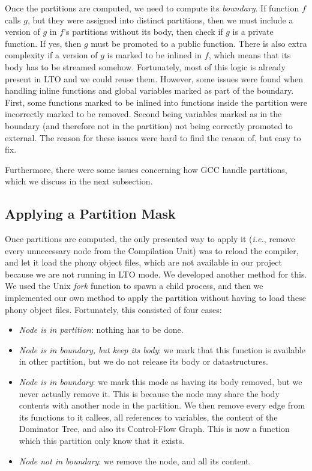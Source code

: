 \documentclass[runningheads]{llncs}
\begin{document}
Once the partitions are computed, we need to compute its \textit{boundary}.
If function $f$ calls $g$, but they were assigned into distinct partitions,
then we must include a version of $g$ in $f$'s partitions without its body,
then check if $g$ is a private function. If yes, then $g$ must be promoted
to a public function. There is also extra complexity if a version of $g$
is marked to be inlined in $f$, which means that its body has to be
streamed somehow. Fortunately, most of this logic is already present
in LTO and we could reuse them. However, some issues were found
when handling inline functions and global variables marked as part
of the boundary. First, some functions marked to be inlined into 
functions inside the partition were incorrectly marked to be removed.
Second being variables marked as in the boundary (and therefore
not in the partition) not being correctly promoted to external. The reason
for these issues were hard to find the reason of, but easy to fix.

Furthermore, there were some issues concerning how GCC handle
partitions, which we discuss in the next subsection.

\subsection{Applying a Partition Mask}\label{sec:partition_mask}

Once partitions are computed, the only presented way to apply it (\textit{i.e.},
remove every unnecessary node from the Compilation Unit) was to reload the
compiler, and let it load the phony object files, which are not available in our
project because we are not running in LTO mode. We developed another method for this.
We used the Unix \textit{fork} function to spawn a child process, and then
we implemented our own method to apply the partition without having to load
these phony object files. Fortunately, this consisted
of four cases:
\begin{itemize}
	\item \textit{Node is in partition}: nothing has to be done.
	\item \textit{Node is in boundary, but keep its body}: we mark that this function
	is available in other partition, but we do not release its body or
	datastructures.
	\item \textit{Node is in boundary}: we mark this mode as having its body removed,
	but we never actually remove it. This is because the node may share the
	body contents with another node in the partition. We then remove
	every edge from its functions to it callees, all references to variables,
	the content of the Dominator Tree, and also its Control-Flow Graph. This
	is now a function which this partition only know that it exists.
	\item \textit{Node not in boundary}: we remove the node, and all its content.
\end{itemize}
\end{document}
